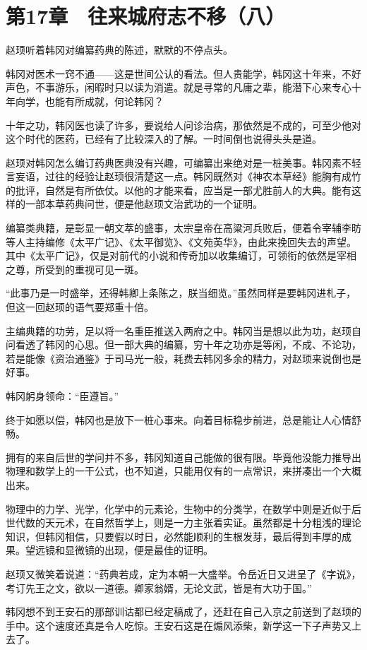 \section{第17章　往来城府志不移（八）}

赵顼听着韩冈对编纂药典的陈述，默默的不停点头。

韩冈对医术一窍不通——这是世间公认的看法。但人贵能学，韩冈这十年来，不好声色，不事游乐，闲暇时只以读为消遣。就是寻常的凡庸之辈，能潜下心来专心十年向学，也能有所成就，何论韩冈？

十年之功，韩冈医也读了许多，要说给人问诊治病，那依然是不成的，可至少他对这个时代的医药，已经有了比较深入的了解。一时间倒也说得头头是道。

赵顼对韩冈怎么编订药典医典没有兴趣，可编纂出来绝对是一桩美事。韩冈素不轻言妄语，过往的经验让赵顼很清楚这一点。韩冈既然对《神农本草经》能胸有成竹的批评，自然是有所依仗。以他的才能来看，应当是一部尤胜前人的大典。能有这样的一部本草药典问世，便是他赵顼文治武功的一个证明。

编纂类典籍，是彰显一朝文萃的盛事，太宗皇帝在高粱河兵败后，便着令宰辅李昉等人主持编修《太平广记》、《太平御览》、《文苑英华》，由此来挽回失去的声望。其中《太平广记》，仅是对前代的小说和传奇加以收集编订，可领衔的依然是宰相之尊，所受到的重视可见一斑。

“此事乃是一时盛举，还得韩卿上条陈之，朕当细览。”虽然同样是要韩冈进札子，但这一回赵顼的语气要郑重十倍。

主编典籍的功劳，足以将一名重臣推送入两府之中。韩冈当是想以此为功，赵顼自问看透了韩冈的心思。但一部大典的编纂，穷十年之功亦是等闲，不成、不论功，若是能像《资治通鉴》于司马光一般，耗费去韩冈多余的精力，对赵顼来说倒也是好事。

韩冈躬身领命：“臣遵旨。”

终于如愿以偿，韩冈也是放下一桩心事来。向着目标稳步前进，总是能让人心情舒畅。

拥有的来自后世的学问并不多，韩冈知道自己能做的很有限。毕竟他没能力推导出物理和数学上的一干公式，也不知道，只能用仅有的一点常识，来拼凑出一个大概出来。

物理中的力学、光学，化学中的元素论，生物中的分类学，在数学中则是近似于后世代数的天元术，在自然哲学上，则是一力主张着实证。虽然都是十分粗浅的理论知识，但韩冈相信，只要假以时日，必然能顺利的生根发芽，最后得到丰厚的成果。望远镜和显微镜的出现，便是最佳的证明。

赵顼又微笑着说道：“药典若成，定为本朝一大盛举。令岳近日又进呈了《字说》，考订先王之文，欲以一道德。卿家翁婿，无论文武，皆是有大功于国。”

韩冈想不到王安石的那部训诂都已经定稿成了，还赶在自己入京之前送到了赵顼的手中。这个速度还真是令人吃惊。王安石这是在煽风添柴，新学这一下子声势又上去了。

